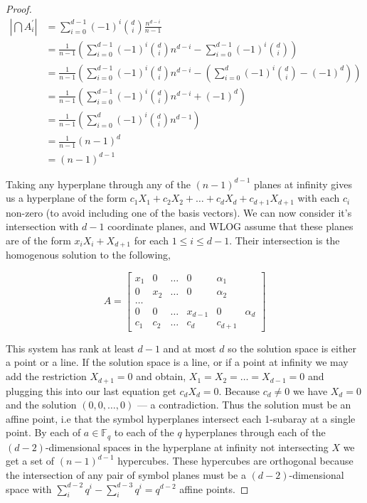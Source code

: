 \documentclass{article}
\begin{document}
\begin{proof}
  \begin{align*}
    |\bigcap A^{\prime}_{i}| &= \sum_{i = 0}^{d - 1} (-1)^{i} \binom{d}{i} \frac{n^{d - i}}{n - 1} \\
                  &= \frac{1}{n - 1}\left(\sum_{i = 0}^{d - 1}{(-1)}^{i} \binom{d}{i} n^{d - i} - \sum_{i = 0}^{d - 1} {(-1)}^{i} \binom{d}{i}\right) \\
                  &= \frac{1}{n - 1}\left(\sum_{i = 0}^{d - 1}{(-1)}^{i} \binom{d}{i} n^{d - i} - \left(\sum_{i = 0}^{d} {(-1)}^{i} \binom{d}{i} - {(-1)}^{d}\right)\right) \\
                  &= \frac{1}{n - 1}\left(\sum_{i = 0}^{d - 1}{(-1)}^{i} \binom{d}{i} n^{d - i} + {(-1)}^{d}\right) \\
                  &= \frac{1}{n - 1}\left(\sum_{i = 0}^{d}{(-1)}^{i} \binom{d}{i} n^{d - 1}\right) \\
                  &= \frac{1}{n - 1}(n - 1)^{d} \\
                  &= (n - 1)^{d - 1}
  \end{align*}


  Taking any hyperplane through any of the \((n - 1)^{d - 1}\) planes at infinity gives us a hyperplane of the form \(c_1X_1 + c_2X_2 + \ldots + c_d X_d + c_{d + 1}X_{d + 1}\) with each \(c_i\) non-zero (to avoid including one of the basis vectors). 
  We can now consider it's intersection with \(d - 1\) coordinate planes, and WLOG assume that these planes are of the form \(x_i X_i + X_{d + 1}\) for each \(1 \leq i \leq d - 1\). Their intersection is the homogenous solution to the following,

  \begin{equation*}
    A = \begin{bmatrix}
      x_1 & 0 & \ldots & 0 & \alpha_1 \\
      0 & x_2 & \ldots & 0 & \alpha_2 \\
      \ldots \\ 
      0 & 0 & \ldots & x_{d - 1} & 0 & \alpha_d \\
      c_1 & c_2 & \ldots & c_d & c_{d + 1} 
    \end{bmatrix}
  \end{equation*}

  This system has rank at least \(d - 1\) and at most \(d\) so the solution space is either a point or a line. If the solution space is a line, or if a point at infinity we may add the restriction \(X_{d + 1} = 0\) and obtain,
  \(X_1 = X_2 = \ldots = X_{d - 1} = 0\) and plugging this into our last equation get \(c_d X_d = 0\). Because \(c_d \neq 0\) we have \(X_d = 0\) and the solution \((0, 0, \ldots, 0)\) --- a contradiction. Thus the solution must be an affine point, i.e that the symbol hyperplanes intersect each 1-subaray at a single point. 
  By each of \(a \in \mathbb{F}_q\) to each of the \(q\) hyperplanes through each of the \((d - 2)\)-dimensional spaces in the hyperplane at infinity not intersecting \(X\) we get a set of \((n - 1)^{d - 1}\) hypercubes. 
  These hypercubes are orthogonal because the intersection of any pair of symbol planes must be a \((d - 2)\)-dimensional space with \(\sum_i^{d - 2} q^{i} - \sum_i^{d - 3} q^{i} = q^{d - 2}\) affine points.


\end{proof}
\end{document}
